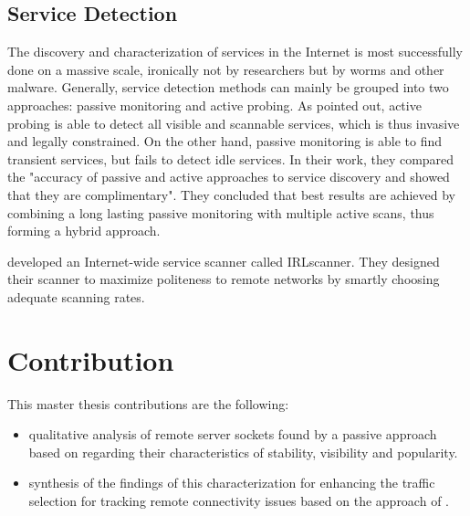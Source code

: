 \subsection{Service Detection} 

The discovery and characterization of services in the Internet is most successfully done on a massive scale, ironically not by researchers but by worms and other malware\citep{Chen:2007}. 
Generally, service detection methods can mainly be grouped into two approaches: passive monitoring and active probing. 
As \citet{Bartlett07b} pointed out, active probing is able to detect all visible and scannable services, which is thus invasive and legally constrained. 
On the other hand, passive monitoring is able to find transient services, but fails to detect idle services. 
In their work, they compared the "accuracy of passive and active approaches to service discovery and showed that they are complimentary"\citep{Bartlett07b}. 
They concluded that best results are achieved by combining a long lasting passive monitoring with multiple active scans, thus forming a hybrid approach\citep{Bartlett07b}. 

\citet{Leonard:2010} developed an Internet-wide service scanner called IRLscanner. 
They designed their scanner to maximize politeness to remote networks by smartly choosing adequate scanning rates. 

\section{Contribution 
\label{sec:contribution}}
This master thesis contributions are the following: 
\begin{itemize}
	\item qualitative analysis of remote server sockets found by a passive approach based on \citet{Schatzmann:Mining,Schatzmann:Dissection, Schatzmann:Tracing} regarding their characteristics of stability, visibility and popularity.
	\item synthesis of the findings of this characterization for enhancing the traffic selection for tracking remote connectivity issues based on the approach of \citet{SchatzmannPAM2011}.
\end{itemize}


